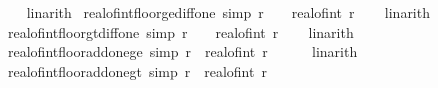 \begin{isabellebody}
%
\isadelimproof
\ \ %
\endisadelimproof
%
\isatagproof
{}\isamarkupfalse%
\ linarith%
\endisatagproof
{\isafoldproof}%
%
\isadelimproof
\isanewline
%
\endisadelimproof
\isanewline
{}\isamarkupfalse%
\ real{\isacharunderscore}{\kern0pt}of{\isacharunderscore}{\kern0pt}int{\isacharunderscore}{\kern0pt}floor{\isacharunderscore}{\kern0pt}ge{\isacharunderscore}{\kern0pt}diff{\isacharunderscore}{\kern0pt}one\ {\isacharbrackleft}{\kern0pt}simp{\isacharbrackright}{\kern0pt}{\isacharcolon}{\kern0pt}\ {\isachardoublequoteopen}r\ {\isacharminus}{\kern0pt}\ {}\ {\isasymle}\ real{\isacharunderscore}{\kern0pt}of{\isacharunderscore}{\kern0pt}int\ {\isasymlfloor}r{\isasymrfloor}{\isachardoublequoteclose}\isanewline
%
\isadelimproof
\ \ %
\endisadelimproof
%
\isatagproof
{}\isamarkupfalse%
\ linarith%
\endisatagproof
{\isafoldproof}%
%
\isadelimproof
\isanewline
%
\endisadelimproof
\isanewline
{}\isamarkupfalse%
\ real{\isacharunderscore}{\kern0pt}of{\isacharunderscore}{\kern0pt}int{\isacharunderscore}{\kern0pt}floor{\isacharunderscore}{\kern0pt}gt{\isacharunderscore}{\kern0pt}diff{\isacharunderscore}{\kern0pt}one\ {\isacharbrackleft}{\kern0pt}simp{\isacharbrackright}{\kern0pt}{\isacharcolon}{\kern0pt}\ {\isachardoublequoteopen}r\ {\isacharminus}{\kern0pt}\ {}\ {\isacharless}{\kern0pt}\ real{\isacharunderscore}{\kern0pt}of{\isacharunderscore}{\kern0pt}int\ {\isasymlfloor}r{\isasymrfloor}{\isachardoublequoteclose}\isanewline
%
\isadelimproof
\ \ %
\endisadelimproof
%
\isatagproof
{}\isamarkupfalse%
\ linarith%
\endisatagproof
{\isafoldproof}%
%
\isadelimproof
\isanewline
%
\endisadelimproof
\isanewline
{}\isamarkupfalse%
\ real{\isacharunderscore}{\kern0pt}of{\isacharunderscore}{\kern0pt}int{\isacharunderscore}{\kern0pt}floor{\isacharunderscore}{\kern0pt}add{\isacharunderscore}{\kern0pt}one{\isacharunderscore}{\kern0pt}ge\ {\isacharbrackleft}{\kern0pt}simp{\isacharbrackright}{\kern0pt}{\isacharcolon}{\kern0pt}\ {\isachardoublequoteopen}r\ {\isasymle}\ real{\isacharunderscore}{\kern0pt}of{\isacharunderscore}{\kern0pt}int\ {\isasymlfloor}r{\isasymrfloor}\ {\isacharplus}{\kern0pt}\ {}{\isachardoublequoteclose}\isanewline
%
\isadelimproof
\ \ %
\endisadelimproof
%
\isatagproof
{}\isamarkupfalse%
\ linarith%
\endisatagproof
{\isafoldproof}%
%
\isadelimproof
\isanewline
%
\endisadelimproof
\isanewline
{}\isamarkupfalse%
\ real{\isacharunderscore}{\kern0pt}of{\isacharunderscore}{\kern0pt}int{\isacharunderscore}{\kern0pt}floor{\isacharunderscore}{\kern0pt}add{\isacharunderscore}{\kern0pt}one{\isacharunderscore}{\kern0pt}gt\ {\isacharbrackleft}{\kern0pt}simp{\isacharbrackright}{\kern0pt}{\isacharcolon}{\kern0pt}\ {\isachardoublequoteopen}r\ {\isacharless}{\kern0pt}\ real{\isacharunderscore}{\kern0pt}of{\isacharunderscore}{\kern0pt}int\ {\isasymlfloor}r{\isasymrfloor}\ {\isacharplus}{\kern0pt}\ {}{\isachardoublequoteclose}\isanewline

\end{isabellebody}
